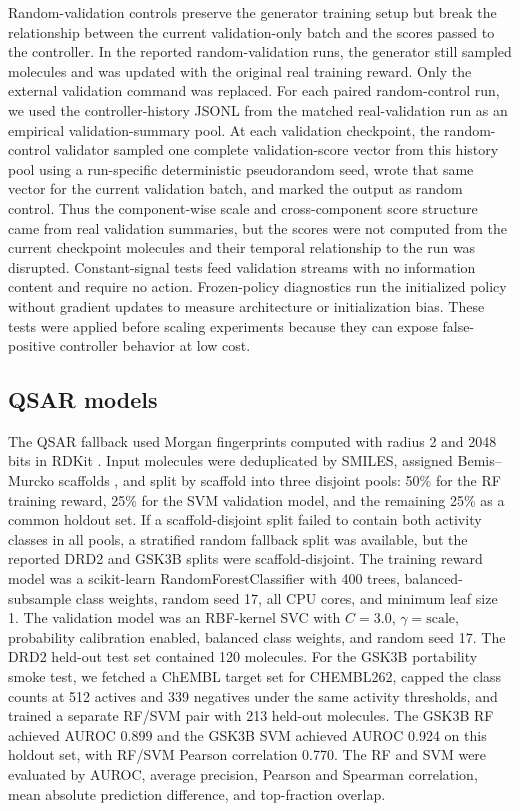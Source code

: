 \documentclass[referee,lineno,pdflatex,sn-basic]{sn-jnl}
\theoremstyle{thmstyleone}%
\theoremstyle{thmstyletwo}%
\theoremstyle{thmstylethree}%
\begin{document}
Random-validation controls preserve the generator training setup but break the relationship between the current validation-only batch and the scores passed to the controller. In the reported random-validation runs, the generator still sampled molecules and was updated with the original real training reward. Only the external validation command was replaced. For each paired random-control run, we used the controller-history JSONL from the matched real-validation run as an empirical validation-summary pool. At each validation checkpoint, the random-control validator sampled one complete validation-score vector from this history pool using a run-specific deterministic pseudorandom seed, wrote that same vector for the current validation batch, and marked the output as random control. Thus the component-wise scale and cross-component score structure came from real validation summaries, but the scores were not computed from the current checkpoint molecules and their temporal relationship to the run was disrupted. Constant-signal tests feed validation streams with no information content and require no action. Frozen-policy diagnostics run the initialized policy without gradient updates to measure architecture or initialization bias. These tests were applied before scaling experiments because they can expose false-positive controller behavior at low cost.

\subsection{QSAR models}\label{subsec:qsar_methods}

The QSAR fallback used Morgan fingerprints \cite{ref-morgan} computed with radius 2 and 2048 bits in RDKit \cite{ref-rdkit}. Input molecules were deduplicated by SMILES, assigned Bemis--Murcko scaffolds \cite{ref-murcko}, and split by scaffold into three disjoint pools: 50\% for the RF training reward, 25\% for the SVM validation model, and the remaining 25\% as a common holdout set. If a scaffold-disjoint split failed to contain both activity classes in all pools, a stratified random fallback split was available, but the reported DRD2 and GSK3B splits were scaffold-disjoint. The training reward model was a scikit-learn \cite{ref-sklearn} RandomForestClassifier with 400 trees, balanced-subsample class weights, random seed 17, all CPU cores, and minimum leaf size 1. The validation model was an RBF-kernel SVC with $C=3.0$, $\gamma=\mathrm{scale}$, probability calibration enabled, balanced class weights, and random seed 17. The DRD2 held-out test set contained 120 molecules. For the GSK3B portability smoke test, we fetched a ChEMBL target set for CHEMBL262, capped the class counts at 512 actives and 339 negatives under the same activity thresholds, and trained a separate RF/SVM pair with 213 held-out molecules. The GSK3B RF achieved AUROC 0.899 and the GSK3B SVM achieved AUROC 0.924 on this holdout set, with RF/SVM Pearson correlation 0.770. The RF and SVM were evaluated by AUROC, average precision, Pearson and Spearman correlation, mean absolute prediction difference, and top-fraction overlap.
\end{document}
